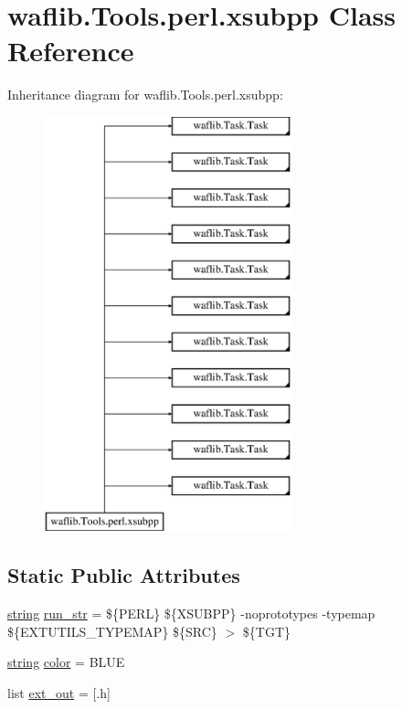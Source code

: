 \hypertarget{classwaflib_1_1_tools_1_1perl_1_1xsubpp}{}\section{waflib.\+Tools.\+perl.\+xsubpp Class Reference}
\label{classwaflib_1_1_tools_1_1perl_1_1xsubpp}
Inheritance diagram for waflib.\+Tools.\+perl.\+xsubpp\+:\begin{figure}[H]
\begin{center}
\leavevmode
\includegraphics[height=12.000000cm]{classwaflib_1_1_tools_1_1perl_1_1xsubpp}
\end{center}
\end{figure}
\subsection*{Static Public Attributes}
\begin{DoxyCompactItemize}
\item 
\hyperlink{test__lib_f_l_a_c_2format_8c_ab02026ad0de9fb6c1b4233deb0a00c75}{string} \hyperlink{classwaflib_1_1_tools_1_1perl_1_1xsubpp_a2b5bf1d83630d743804e9a819b5642a7}{run\+\_\+str} = \textquotesingle{}\$\{P\+E\+RL\} \$\{X\+S\+U\+B\+PP\} -\/noprototypes -\/typemap \$\{E\+X\+T\+U\+T\+I\+L\+S\+\_\+\+T\+Y\+P\+E\+M\+AP\} \$\{S\+RC\} $>$ \$\{T\+GT\}\textquotesingle{}
\item 
\hyperlink{test__lib_f_l_a_c_2format_8c_ab02026ad0de9fb6c1b4233deb0a00c75}{string} \hyperlink{classwaflib_1_1_tools_1_1perl_1_1xsubpp_a9d57fe26fc85f56d275da879dcf08933}{color} = \textquotesingle{}B\+L\+UE\textquotesingle{}
\item 
list \hyperlink{classwaflib_1_1_tools_1_1perl_1_1xsubpp_a9ce9dd72e0deb1e8c55b3cff88a90814}{ext\+\_\+out} = \mbox{[}\textquotesingle{}.h\textquotesingle{}\mbox{]}
\end{DoxyCompactItemize}
